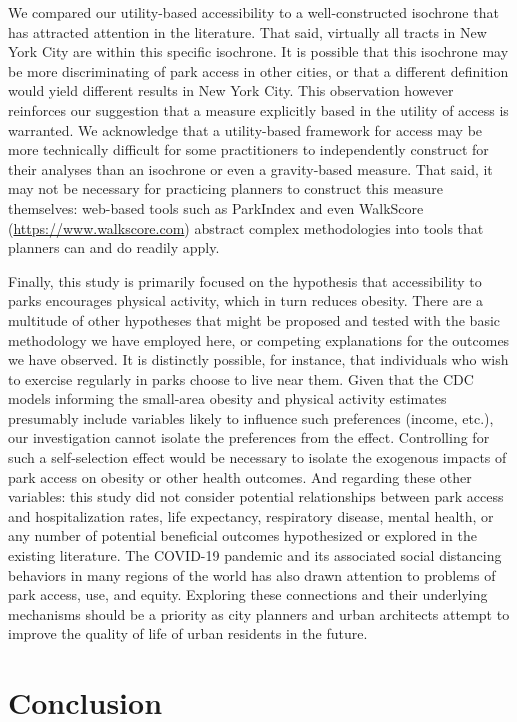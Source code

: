 \documentclass[Crown,sageh.bst]{sagej}
\begin{document}
We compared our utility-based accessibility to a well-constructed
isochrone that has attracted attention in the literature. That said,
virtually all tracts in New York City are within this specific
isochrone. It is possible that this isochrone may be more discriminating
of park access in other cities, or that a different definition would
yield different results in New York City. This observation however
reinforces our suggestion that a measure explicitly based in the utility
of access is warranted. We acknowledge that a utility-based framework
for access may be more technically difficult for some practitioners to
independently construct for their analyses than an isochrone or even a
gravity-based measure. That said, it may not be necessary for practicing
planners to construct this measure themselves: web-based tools such as
ParkIndex \citep{Kaczynski2016} and even WalkScore
(\url{https://www.walkscore.com}) abstract complex methodologies into
tools that planners can and do readily apply.

Finally, this study is primarily focused on the hypothesis that
accessibility to parks encourages physical activity, which in turn
reduces obesity. There are a multitude of other hypotheses that might be
proposed and tested with the basic methodology we have employed here, or
competing explanations for the outcomes we have observed. It is
distinctly possible, for instance, that individuals who wish to exercise
regularly in parks choose to live near them. Given that the CDC models
informing the small-area obesity and physical activity estimates
presumably include variables likely to influence such preferences
(income, etc.), our investigation cannot isolate the preferences from
the effect. Controlling for such a self-selection effect would be
necessary to isolate the exogenous impacts of park access on obesity or
other health outcomes. And regarding these other variables: this study
did not consider potential relationships between park access and
hospitalization rates, life expectancy, respiratory disease, mental
health, or any number of potential beneficial outcomes hypothesized or
explored in the existing literature. The COVID-19 pandemic and its
associated social distancing behaviors in many regions of the world has
also drawn attention to problems of park access, use, and equity.
Exploring these connections and their underlying mechanisms should be a
priority as city planners and urban architects attempt to improve the
quality of life of urban residents in the future.

\hypertarget{conclusion}{%
\section{Conclusion}\label{conclusion}}
\end{document}
